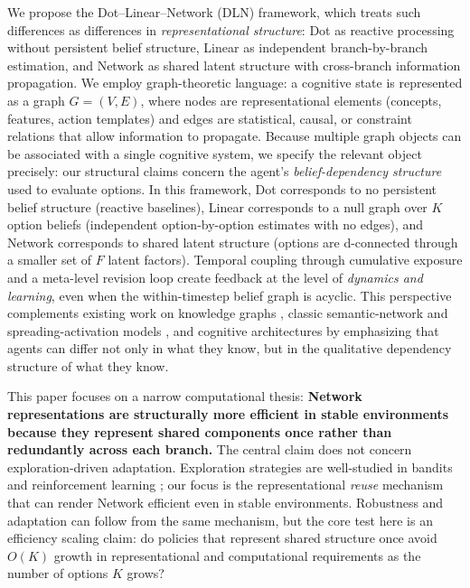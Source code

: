 \documentclass[11pt]{article}
\begin{document}
We propose the Dot--Linear--Network (DLN) framework, which treats such differences as differences in
\emph{representational structure}: Dot as reactive processing without persistent belief structure,
Linear as independent branch-by-branch estimation, and Network as shared latent structure with
cross-branch information propagation. We employ graph-theoretic language: a cognitive state is
represented as a graph $G=(V,E)$, where nodes are representational elements (concepts, features,
action templates) and edges are statistical, causal, or constraint relations that allow information
to propagate. Because multiple graph objects can be associated with a single cognitive system, we
specify the relevant object precisely: our structural claims concern the agent's
\emph{belief-dependency structure} used to evaluate options. In this framework, Dot corresponds to
no persistent belief structure (reactive baselines), Linear corresponds to a null graph over $K$
option beliefs (independent option-by-option estimates with no edges), and Network corresponds to
shared latent structure (options are d-connected through a smaller set of $F$ latent factors).
Temporal coupling through cumulative exposure and a meta-level revision loop create feedback at
the level of \emph{dynamics and learning}, even when the within-timestep belief graph is acyclic.
This perspective complements existing work on knowledge graphs \cite{Hogan2021}, classic
semantic-network and spreading-activation models \cite{CollinsLoftus1975,Anderson1983}, and
cognitive architectures \cite{ACTR2004,Laird2012} by emphasizing that agents can differ not only in
what they know, but in the qualitative dependency structure of what they know.

This paper focuses on a narrow computational thesis: \textbf{Network representations are structurally more efficient in stable environments because they represent shared components once rather than redundantly across each branch.} The central claim does not concern exploration-driven adaptation. Exploration strategies are well-studied in bandits and reinforcement learning \cite{Gershman2018,RussoBandits2018,SuttonBarto2018}; our focus is the representational \emph{reuse} mechanism that can render Network efficient even in stable environments. Robustness and adaptation can follow from the same mechanism, but the core test here is an efficiency scaling claim: do policies that represent shared structure once avoid $O(K)$ growth in representational and computational requirements as the number of options $K$ grows?
\end{document}
